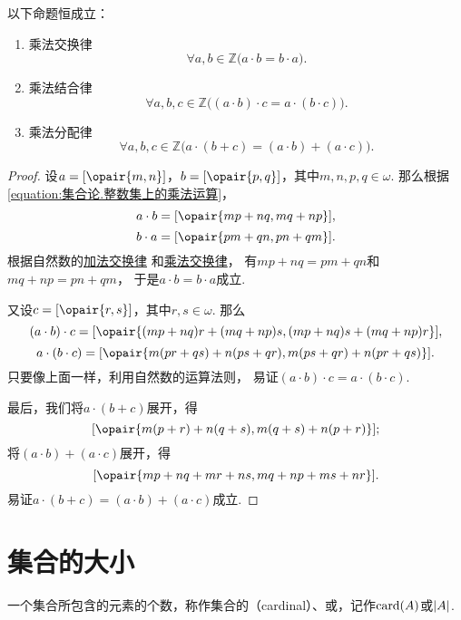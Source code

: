 \begin{theorem}
以下命题恒成立：
\begin{enumerate}
	\item 乘法交换律
	\begin{equation}\label{equation:集合论.整数乘法交换律}
		\forall a,b\in\mathbb{Z} \bigl(
			a \cdot b = b \cdot a
		\bigr).
	\end{equation}
	\item 乘法结合律
	\begin{equation}\label{equation:集合论.整数乘法结合律}
		\forall a,b,c\in\mathbb{Z} \bigl(
			(a \cdot b) \cdot c = a \cdot (b \cdot c)
		\bigr).
	\end{equation}
	\item 乘法分配律
	\begin{equation}\label{equation:集合论.整数乘法分配律}
		\forall a,b,c\in\mathbb{Z} \bigl(
			a \cdot (b + c) = (a \cdot b) + (a \cdot c)
		\bigr).
	\end{equation}
\end{enumerate}
\begin{proof}
设\(a=[\opair{m,n}]\)，\(b=[\opair{p,q}]\)，其中\(m,n,p,q\in\omega\).
那么根据\cref{equation:集合论.整数集上的乘法运算}，\[
	a \cdot b = [\opair{mp+nq,mq+np}],
\]\[
	b \cdot a = [\opair{pm+qn,pn+qm}].
\]
根据自然数的\hyperref[equation:集合论.自然数加法交换律]{加法交换律}%
和\hyperref[equation:集合论.自然数乘法交换律]{乘法交换律}，
有\(mp+nq=pm+qn\)和\(mq+np=pn+qm\)，
于是\(a \cdot b = b \cdot a\)成立.

又设\(c=[\opair{r,s}]\)，其中\(r,s\in\omega\).
那么\[
	(a \cdot b) \cdot c
	= [\opair{(mp+nq)r+(mq+np)s,(mp+nq)s+(mq+np)r}],
\]\[
	a \cdot (b \cdot c)
	= [\opair{m(pr+qs)+n(ps+qr),m(ps+qr)+n(pr+qs)}].
\]
只要像上面一样，利用自然数的运算法则，
易证\((a \cdot b) \cdot c = a \cdot (b \cdot c)\).

最后，我们将\(a \cdot (b+c)\)展开，得\[
	[\opair{m(p+r)+n(q+s),m(q+s)+n(p+r)}];
\]
将\((a \cdot b) + (a \cdot c)\)展开，得\[
	[\opair{mp+nq+mr+ns,mq+np+ms+nr}].
\]
易证\(a \cdot (b + c) = (a \cdot b) + (a \cdot c)\)成立.
\end{proof}
\end{theorem}


\section{集合的大小}
\begin{definition}
一个集合所包含的元素的个数，称作集合的（cardinal）、或，记作\(\operatorname{card}(A)\)或\(\abs{A}\).
\end{definition}

